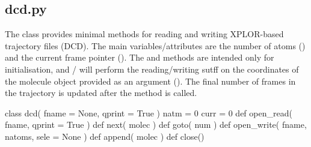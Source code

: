 \normalsize
\subsection[dcd]{dcd.py}
The class  provides
minimal methods for reading and writing XPLOR-based trajectory files (DCD). The main variables/attributes are
the number of atoms () and the current frame pointer ().
The  and  methods are intended
only for initialisation, and / will perform the reading/writing sutff on the coordinates
of the molecule object provided as an argument ().
The final number of frames in the trajectory is updated after the  method is called.\\
\begin{pyglist}[language=python,fvset={frame=single}]
class dcd( fname = None, qprint = True )
    natm = 0
    curr = 0
    def open_read( fname, qprint = True )
    def next( molec )
    def goto( num )
    def open_write( fname, natoms, sele = None )
    def append( molec )
    def close()
\end{pyglist}
